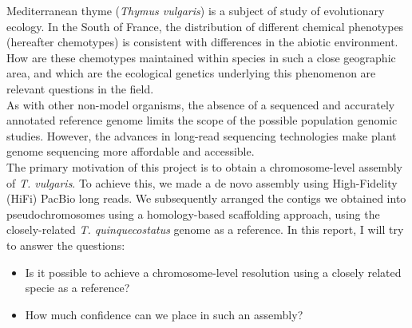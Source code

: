 Mediterranean thyme (\textit{Thymus vulgaris}) is a subject of study of evolutionary ecology. In the South of France, the distribution of different chemical phenotypes (hereafter chemotypes) is consistent with differences in the abiotic environment. How are these chemotypes maintained within species in such a close geographic area, and which are the ecological genetics underlying this phenomenon are relevant questions in the field.~\cite{bataillon_genotype_2022}\\

As with other non-model organisms, the absence of a sequenced and accurately annotated reference genome limits the scope of the possible population genomic studies. However, the advances in long-read sequencing technologies make plant genome sequencing more affordable and accessible.~\cite{pucker_plant_2022} \\

The primary motivation of this project is to obtain a chromosome-level assembly of \textit{T. vulgaris}. To achieve this, we made a de novo assembly using High-Fidelity (HiFi) PacBio long reads. We subsequently arranged the contigs we obtained into pseudochromosomes using a homology-based scaffolding approach, using the closely-related \textit{T. quinquecostatus} genome as a reference. In this report, I will try to answer the questions:

\begin{itemize}
    \item Is it possible to achieve a chromosome-level resolution using a closely related specie as a reference?
    \item How much confidence can we place in such an assembly?
\end{itemize}

